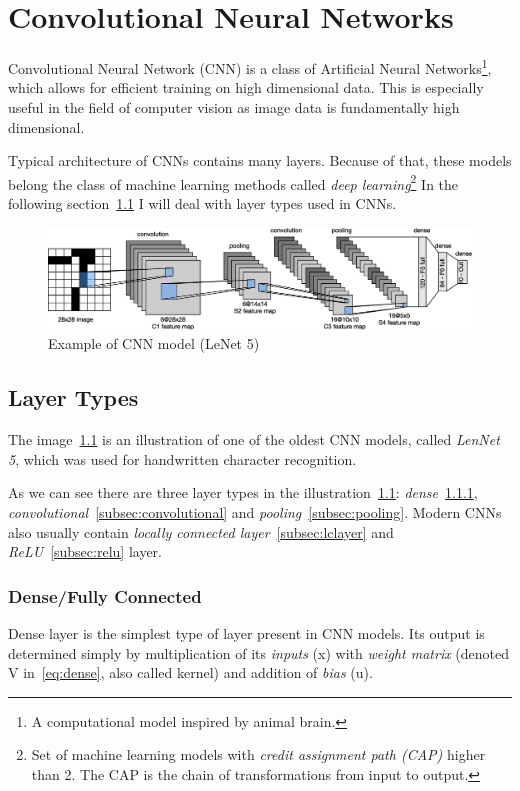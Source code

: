 \chapter{Convolutional Neural Networks}\label{ch:cnn}
Convolutional Neural Network (CNN) is a class of Artificial Neural Networks\footnote{A computational model inspired by
animal brain.}, which allows for efficient training on high dimensional data.
This is especially useful in the field of computer vision as image data is fundamentally high dimensional.

Typical architecture of CNNs contains many layers.
Because of that, these models belong the class of machine learning methods called
\textit{deep learning}\footnote{Set of machine learning models with \textit{credit assignment path (CAP)} higher than 2.
The CAP is the chain of transformations from input to output.}
In the following section~\ref{sec:layer-types} I will deal with layer types used in CNNs.

\begin{figure}[H]
    \centering
    \includegraphics[width=\columnwidth]{images/cnn/lenet.eps}
    \caption{Example of CNN model (LeNet 5)~\cite{LeNet5}}
    \label{fig:cnn}
\end{figure}

\section{Layer Types}\label{sec:layer-types}
The image~\ref{fig:cnn} is an illustration of one of the oldest CNN models, called \textit{LenNet 5}, which was used for
handwritten character recognition.

As we can see there are three layer types in the illustration~\ref{fig:cnn}: \textit{dense}~\ref{subsec:dense},
\textit{convolutional}~\ref{subsec:convolutional} and \textit{pooling}~\ref{subsec:pooling}.
Modern CNNs also usually contain \textit{locally connected layer}~\ref{subsec:lclayer} and
\textit{ReLU}~\ref{subsec:relu} layer.

\subsection{Dense/Fully Connected}\label{subsec:dense}
Dense layer is the simplest type of layer present in CNN models.
Its output is determined simply by multiplication of its \textit{inputs} (x) with \textit{weight matrix}
(denoted V in~\ref{eq:dense}, also called kernel) and addition of \textit{bias} (u).

